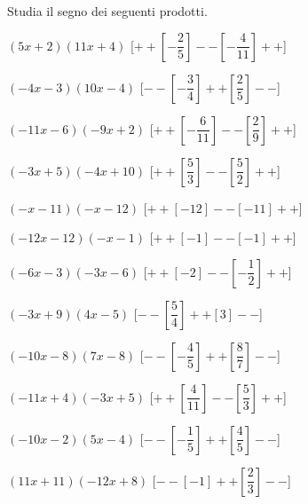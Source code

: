 \begin{esercizio}\label{ese:dis_6}
 Studia il segno dei seguenti prodotti.
 \begin{enumeratea}
  \item  $\left(5 x +2\right)\left(11 x +4\right)$ \hfill 
  [$++\left [-\dfrac{2}{5} \right ]--\left [-\dfrac{4}{11} \right ]++$]
  \item  $\left(-4 x -3\right)\left(10 x -4\right)$ \hfill 
  [$--\left [-\dfrac{3}{4} \right ]++\left [\dfrac{2}{5} \right ]--$]
  \item  $\left(-11 x -6\right)\left(-9 x +2\right)$ \hfill 
  [$++\left [-\dfrac{6}{11} \right ]--\left [\dfrac{2}{9} \right ]++$]
  \item  $\left(-3 x +5\right)\left(-4 x +10\right)$ \hfill 
  [$++\left [\dfrac{5}{3} \right ]--\left [\dfrac{5}{2} \right ]++$]
  \item  $\left(- x -11\right)\left(- x -12\right)$ \hfill 
  [$++\left [-12 \right ]--\left [-11 \right ]++$]
  \item  $\left(-12 x -12\right)\left(- x -1\right)$ \hfill 
  [$++\left [-1 \right ]--\left [-1 \right ]++$]
  \item  $\left(-6 x -3\right)\left(-3 x -6\right)$ \hfill 
  [$++\left [-2 \right ]--\left [-\dfrac{1}{2} \right ]++$]
  \item  $\left(-3 x +9\right)\left(4 x -5\right)$ \hfill 
  [$--\left [\dfrac{5}{4} \right ]++\left [3 \right ]--$]
  \item  $\left(-10 x -8\right)\left(7 x -8\right)$ \hfill 
  [$--\left [-\dfrac{4}{5} \right ]++\left [\dfrac{8}{7} \right ]--$]
  \item  $\left(-11 x +4\right)\left(-3 x +5\right)$ \hfill 
  [$++\left [\dfrac{4}{11} \right ]--\left [\dfrac{5}{3} \right ]++$]
  \item  $\left(-10 x -2\right)\left(5 x -4\right)$ \hfill 
  [$--\left [-\dfrac{1}{5} \right ]++\left [\dfrac{4}{5} \right ]--$]
  \item  $\left(11 x +11\right)\left(-12 x +8\right)$ \hfill 
  [$--\left [-1 \right ]++\left [\dfrac{2}{3} \right ]--$]
 \end{enumeratea}
\end{esercizio}

\subsubsection*{}

